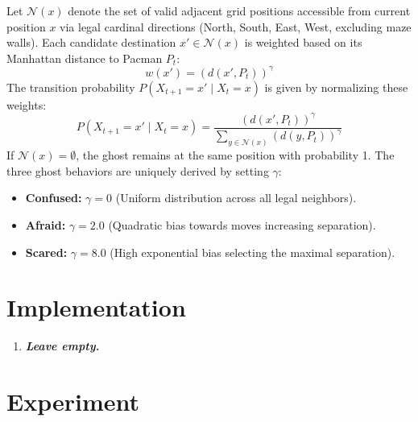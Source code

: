\documentclass{article}
\begin{document}
\begin{enumerate}[label=\alph*.,leftmargin=*]
    Let $\mathcal{N}(x)$ denote the set of valid adjacent grid positions accessible from current position $x$ via legal cardinal directions (North, South, East, West, excluding maze walls). Each candidate destination $x' \in \mathcal{N}(x)$ is weighted based on its Manhattan distance to Pacman $P_t$:
    \begin{equation}
    w(x') = \left( d(x', P_t) \right)^\gamma
    \end{equation}
    The transition probability $P(X_{t+1} = x' \mid X_t = x)$ is given by normalizing these weights:
    \begin{equation}
    P(X_{t+1} = x' \mid X_t = x) = \frac{\left( d(x', P_t) \right)^\gamma}{\sum_{y \in \mathcal{N}(x)} \left( d(y, P_t) \right)^\gamma}
    \end{equation}
    If $\mathcal{N}(x) = \emptyset$, the ghost remains at the same position with probability 1. The three ghost behaviors are uniquely derived by setting $\gamma$:
    \begin{itemize}
        \item \textbf{Confused:} $\gamma = 0$ (Uniform distribution across all legal neighbors).
        \item \textbf{Afraid:} $\gamma = 2.0$ (Quadratic bias towards moves increasing separation).
        \item \textbf{Scared:} $\gamma = 8.0$ (High exponential bias selecting the maximal separation).
    \end{itemize}
\end{enumerate}

\section{Implementation}

\begin{enumerate}[label=\alph*.,leftmargin=*]
    \item \textbf{\textit{Leave empty.}}
\end{enumerate}

\section{Experiment}
\end{document}
